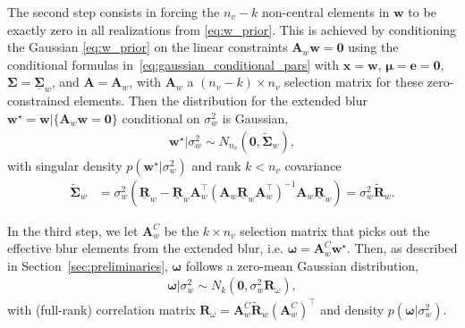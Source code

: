 \documentclass[12pt]{article}
\newcommand{\mycirc}[1] {\underline{\bm{#1}}}
\begin{document}
The second step consists in forcing the $n_v-k$ non-central elements in $\bm{w}$ to be exactly zero in all realizations from \eqref{eq:w_prior}. This is achieved by conditioning the Gaussian \eqref{eq:w_prior} on the linear constraints $\bm{A}_w \bm{w} = \bm{0}$ using the conditional formulas in~\eqref{eq:gaussian_conditional_pars} with $\bm{x} = \bm{w}$, $\bm{\mu} = \bm{e}=\bm{0}$,  $\bm{\Sigma} = \mycirc{\Sigma}_w$, and $\bm{A}=\bm{A}_w$, with $\bm{A}_w$ a $(n_v - k) \times n_v$ selection matrix for these zero-constrained elements.
Then the distribution for the extended blur $\bm{w}^{\star} = \bm{w} | \{\bm{A}_w \bm{w} = \bm{0} \}$ conditional on $\sigma_w^2$ is Gaussian,
\begin{align}\label{eq:w_star_prior}
    \bm{w}^{\star}|\sigma_w^2 \sim N_{n_{v}}(\bm{0}, \tilde{\bm{\Sigma}}_w),
\end{align}
with singular density $p(\bm{w}^{\star} | \sigma_w^2)$ and rank $k<n_v$ covariance
\begin{equation} \label{eq:covariance_w_star}
\begin{split}
    \tilde{\bm{\Sigma}}_w &= \sigma_w^2 \left ( \mycirc{R}_w - \mycirc{R}_w \bm{A}_w^{\top} (\bm{A}_w \mycirc{R}_w \bm{A}_w^{\top})^{-1}\bm{A}_w\mycirc{R}_w \right ) = \sigma_w^2 \tilde{\bm{R}}_w.
\end{split}
\end{equation}

In the third step, we let $\bm{A}_{w}^C$ be the $k \times n_v$ selection matrix that picks out the effective blur elements from the extended blur, i.e. $\bm{\omega} = \bm{A}_w^C \bm{w}^{\star}$. Then, as described in Section~\ref{sec:preliminaries}, $\bm{\omega}$ follows a zero-mean Gaussian distribution,
\begin{align}\label{eq:omega_prior}
    \bm{\omega}|\sigma_w^2 \sim N_{k}(\bm{0}, \sigma_w^2 \bm{R}_{\omega}),
\end{align}
with (full-rank) correlation matrix $\bm{R}_{\omega} = \bm{A}_{w}^C \tilde{\bm{R}}_{w} (\bm{A}_{w}^{C})^{\top}$ and density $p(\bm{\omega}|\sigma_w^2)$.
\end{document}

